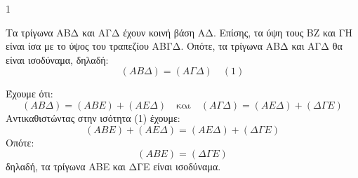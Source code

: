 \begin{ylh}{1}
    \item [ΛΥΣΗ]
\end{ylh}

\begin{figure}
    \centering
\end{figure}

\begin{alist}
    \item Τα τρίγωνα ΑΒΔ και ΑΓΔ έχουν κοινή βάση ΑΔ. Επίσης, τα ύψη τους ΒΖ και ΓΗ είναι ίσα με το ύψος του τραπεζίου ΑΒΓΔ. Οπότε, τα τρίγωνα ΑΒΔ και ΑΓΔ θα είναι ισοδύναμα, δηλαδή:
    \[
        (ΑΒΔ) = (ΑΓΔ) \quad (1)
    \]

    \item Έχουμε ότι:
    \[
        (ΑΒΔ) = (ΑΒΕ) + (ΑΕΔ) \quad \text{και} \quad (ΑΓΔ) = (ΑΕΔ) + (ΔΓΕ)
    \]
    Αντικαθιστώντας στην ισότητα (1) έχουμε:
    \[
        (ΑΒΕ) + (ΑΕΔ) = (ΑΕΔ) + (ΔΓΕ)
    \]
    Οπότε:
    \[
        (ΑΒΕ) = (ΔΓΕ)
    \]
    δηλαδή, τα τρίγωνα ΑΒΕ και ΔΓΕ είναι ισοδύναμα.
\end{alist}